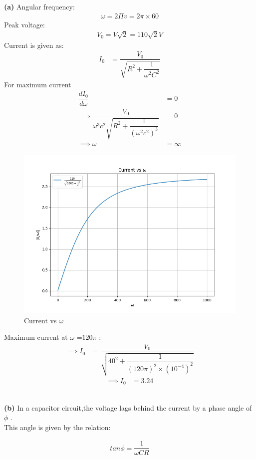 \documentclass[journal,12pt,twocolumn]{IEEEtran}
\theoremstyle{remark}
\begin{document}
\textbf{(a)} 
Angular frequency:
\begin{align}
\label{eq:tri-pts/5} \omega =2\Pi v =2\pi \times 60
\end{align}
Peak voltage:
\begin{align}
\label{eq:tri-pts/6}V_0=V\sqrt{2}=110\sqrt{2}V
\end{align}
Current is given as: 
\begin{align}
	\label{eq:tri-pts/9} I_0 &=\dfrac{V_0}{\sqrt{R^2 + \dfrac{1}{\omega^2C^2}}}
\end{align}
For maximum current 
\begin{align}
	\label{eq:tri-pts/27} \dfrac{dI_0}{d\omega}&=0\\
	\implies \dfrac{V_0}{ \omega^3 c^2 \sqrt{R^2 + \dfrac{1}{(\omega^2c^2)^3}}}&=0\\
\implies \omega&=\infty
\end{align}
\begin{figure}[h]
    \centering
    \includegraphics[width = 2.4 in, height = 1.6 in]{figs/fig4.png}
    \caption{Current vs $\omega$}
    \label{fig:h_plot}
\end{figure}

Maximum current at $\omega$ =$120\pi$ :
\begin{align}
	\label{eq:tri-pts/10}\implies I_0 &=\dfrac{V_0}{\sqrt{40^2 + \dfrac{1}{{(120\pi)^2 \times (10^{-4})^2}}}}
\end{align}
\begin{align}
	\label{eq:tri-pts/11}\implies I_0 &=3.24
\end{align}
\\
\begin{flushleft}\textbf{(b)} In a capacitor circuit,the voltage lags behind the current by a phase angle of $\phi$ .\\
This angle is given by the relation:\\
\end{flushleft}
\begin{align}
	\label{eq:tri-pts/12} tan\phi=\dfrac{1}{\omega CR}
\end{align}
\end{document}
